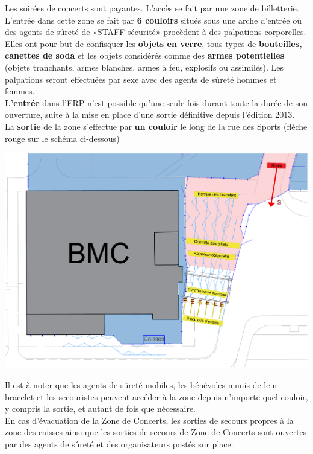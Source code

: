 \documentclass[hidelinks, paper=a4, fontsize=13pt]{report}
\begin{document}
Les soirées de concerts sont payantes. L’accès se fait par une zone de billetterie. L’entrée dans cette zone se fait par \textbf{6 couloirs} situés sous une arche d’entrée où des agents de sûreté de «STAFF sécurité» procèdent à des palpations corporelles. \\

Elles ont pour but de confisquer les \textbf{objets en verre}, tous types de \textbf{bouteilles, canettes de soda} et les objets considérés comme des \textbf{armes potentielles} (objets tranchants, armes blanches, armes à feu, explosifs ou assimilés). 
Les palpations seront effectuées par sexe avec des agents de sûreté hommes et femmes.\\

\textbf{L’entrée} dans l’ERP n’est possible qu’une seule fois durant toute la durée de son ouverture, suite à la mise en place d’une sortie définitive depuis l’édition 2013. \\
La \textbf{sortie} de la zone s’effectue par \textbf{un couloir} le long de la rue des Sports (flèche rouge sur le schéma ci-dessous)

\begin{center}
	\includegraphics[width=.8\textwidth,keepaspectratio]{Exports/Plan_24h_44eme-Entree_Etapes}
\end{center}

Il est à noter que les agents de sûreté mobiles, les bénévoles munis de leur bracelet et les secouristes peuvent accéder à la zone depuis n’importe quel couloir, y compris la sortie, et autant de fois que nécessaire.\\

En cas d’évacuation de la Zone de Concerts, les sorties de secours propres à la zone des caisses  ainsi que les sorties de secours de Zone de Concerts sont ouvertes par des agents de sûreté et des organisateurs postés sur place. 
\end{document}
